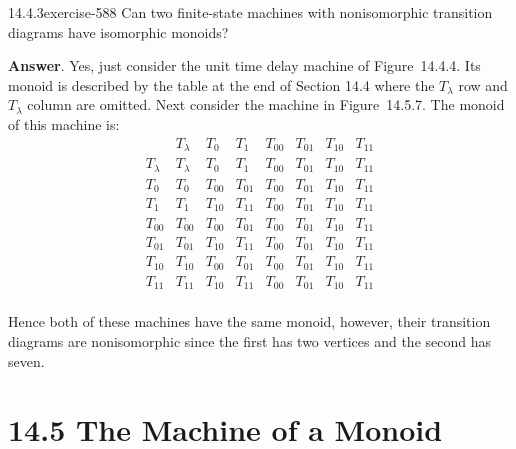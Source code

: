 \documentclass[twoside,10pt,]{book}
\numberwithin{equation}{section}
\begin{document}
\begin{divisionsolution}{14.4.3}{}{exercise-588}%
\hypertarget{p-5273}{}%
Can two finite-state machines with nonisomorphic transition diagrams have isomorphic monoids?%
\par\smallskip%
\noindent\textbf{Answer}.\quad%
\hypertarget{p-5274}{}%
Yes, just consider the unit time delay machine of Figure~14.4.4. Its monoid is described by the table at the end of Section 14.4 where the \(T_{\lambda
}\) row and \(T_{\lambda }\) column are omitted. Next consider the machine in Figure~14.5.7. The monoid of this machine is:%
\begin{equation*}
\begin{array}{c|ccccccc}
& T_{\lambda } & T_0 & T_1 & T_{00} & T_{01} & T_{10} & T_{11} \\
\hline
T_{\lambda } & T_{\lambda } & T_0 & T_1 & T_{00} & T_{01} & T_{10} & T_{11} \\
\hline
T_0 & T_0 & T_{00} & T_{01} & T_{00} & T_{01} & T_{10} & T_{11} \\
T_1 & T_1 & T_{10} & T_{11} & T_{00} & T_{01} & T_{10} & T_{11} \\
T_{00} & T_{00} & T_{00} & T_{01} & T_{00} & T_{01} & T_{10} & T_{11} \\
T_{01} & T_{01} & T_{10} & T_{11} & T_{00} & T_{01} & T_{10} & T_{11} \\
T_{10} & T_{10} & T_{00} & T_{01} & T_{00} & T_{01} & T_{10} & T_{11} \\
T_{11} & T_{11} & T_{10} & T_{11} & T_{00} & T_{01} & T_{10} & T_{11} \\
\end{array}
\end{equation*}
%
\par
\hypertarget{p-5275}{}%
Hence both of these machines have the same monoid, however, their transition diagrams are nonisomorphic since the first has two vertices and the second has seven.%
\end{divisionsolution}%
\section*{14.5 The Machine of a Monoid}
\end{document}
